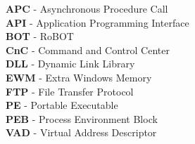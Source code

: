 \textbf{APC} - Asynchronous Procedure Call \\
\textbf{API} - Application Programming Interface \\
\textbf{BOT} - RoBOT \\
\textbf{CnC} - Command and Control Center \\
\textbf{DLL} - Dynamic Link Library \\
\textbf{EWM} - Extra Windows Memory \\
\textbf{FTP} - File Transfer Protocol \\
\textbf{PE}	 - Portable Executable \\
\textbf{PEB} - Process Environment Block \\
\textbf{VAD} - Virtual Address Descriptor \\